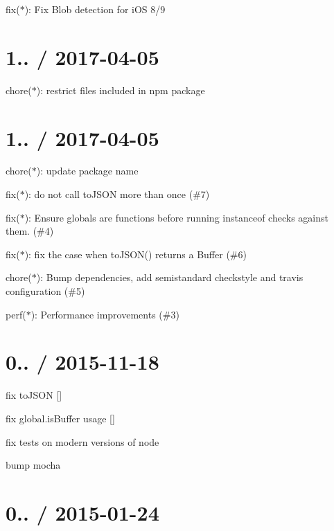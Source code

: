 
\begin{DoxyItemize}
\item fix($\ast$)\+: Fix Blob detection for i\+OS 8/9
\end{DoxyItemize}

\section*{1.. / 2017-\/04-\/05 }


\begin{DoxyItemize}
\item chore($\ast$)\+: restrict files included in npm package
\end{DoxyItemize}

\section*{1.. / 2017-\/04-\/05 }


\begin{DoxyItemize}
\item chore($\ast$)\+: update package name
\item fix($\ast$)\+: do not call to\+J\+S\+ON more than once (\#7)
\item fix($\ast$)\+: Ensure globals are functions before running {\ttfamily instanceof} checks against them. (\#4)
\item fix($\ast$)\+: fix the case when to\+J\+S\+O\+N() returns a Buffer (\#6)
\item chore($\ast$)\+: Bump dependencies, add semistandard checkstyle and travis configuration (\#5)
\item perf($\ast$)\+: Performance improvements (\#3)
\end{DoxyItemize}

\section*{0.. / 2015-\/11-\/18 }


\begin{DoxyItemize}
\item fix to\+J\+S\+ON \mbox{[}\mbox{]}
\item fix {\ttfamily global.\+is\+Buffer} usage \mbox{[}\mbox{]}
\item fix tests on modern versions of node
\item bump mocha
\end{DoxyItemize}

\section*{0.. / 2015-\/01-\/24 }


